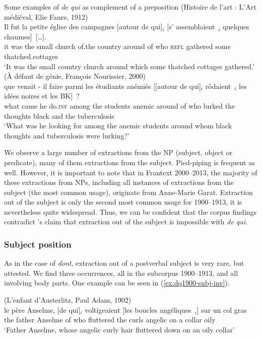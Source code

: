\ex Some examples of \emph{de qui} as complement of a preposition \label{ex:dq2000-prep}
\ea (Histoire de l'art : L'Art médiéval, Elie Faure, 1912)\\
\gll Il fut la petite église des campagnes [autour de qui]$_i$ [s' assemblaient~\trace{}$_i$ quelques chaumes]~[\dots].\\
it was the small church of.the country around of who \textsc{refl} gathered some thatched.cottages\\
\glt `It was the small country church around which some thatched cottages gathered.'
\ex (À défaut de génie, Fran\c{c}ois Nourissier, 2000)\\
\gll [\dots] que venait - il faire parmi les étudiants anémiés [[autour de qui]$_i$ rôdaient~\trace{}$_i$ les idées noires et les BK]~?\\
{} what came {} he do\textsc{.inf} among the students anemic around of who lurked the thoughts black and the tuberculosis\\
\glt `What was he looking for among the anemic students around whom black thoughts and tuberculosis were lurking?'
\z
\z

We observe a large number of extractions from the NP (subject, object or predicate), many of them extractions from the subject. Pied-piping is frequent as well. However, it is important to note that in Frantext 2000--2013, the majority of these extractions from NPs, including all instances of extractions from the subject (the most common usage), originate from Anne-Marie Garat. Extraction out of the subject is only the second most common usage for 1900--1913, it is nevertheless quite widespread.
Thus, we can be confident that the corpus findings contradict 's claim that extraction out of the subject is impossible with \emph{de qui}. 

\subsubsection{Subject position}\largerpage

As in the case of \emph{dont}, extraction out of a postverbal subject is very rare, but attested. We find three occurrences, all in the subcorpus 1900--1913, and all involving body parts. One example can be seen in (\ref{ex:dq1900-subj-inv}).  

\ea (L'enfant d'Austerlitz, Paul Adam, 1902)\\
\gll le père Anselme, [de qui]$_i$ voltigeaient [les boucles angéliques~\trace{}$_i$] sur un col gras\\
the father Anselme of who fluttered the curls angelic on a collar oily\\
\glt `Father Anselme, whose angelic curly hair fluttered down on an oily collar'
\label{ex:dq1900-subj-inv}
\z 

